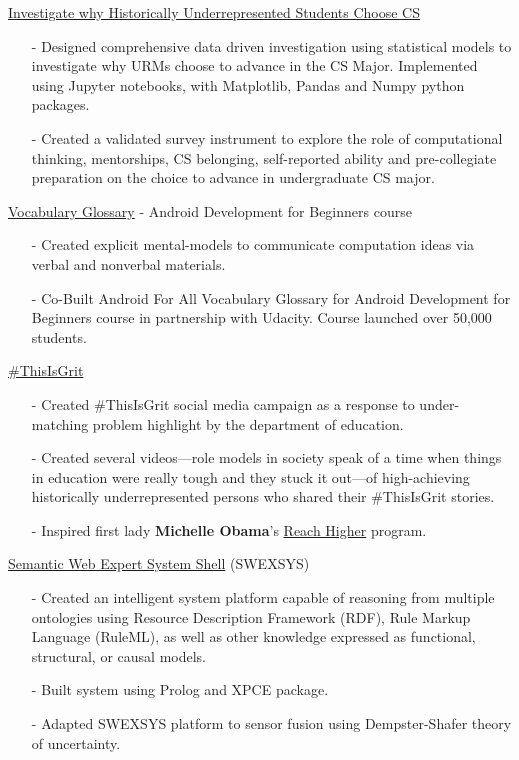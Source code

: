 \documentclass[11pt,article,oneside]{memoir}
\begin{document}
\ind \href{https://github.com/omoju/investigatingWhyURMsChooseCS}{Investigate why Historically Underrepresented Students Choose CS}
\begin{itemize}[noitemsep,nolistsep]
\item[-] Designed comprehensive data driven investigation using statistical models to investigate why URMs choose to advance in the CS Major. Implemented using Jupyter notebooks, with Matplotlib, Pandas and Numpy python packages.
\item[-] Created a validated survey instrument to explore the role of computational thinking, mentorships, CS belonging, self-reported ability and pre-collegiate preparation on the choice to advance in undergraduate CS major.  
\end{itemize} 

\ind \href{https://developers.google.com/android/for-all/vocab-words/}{Vocabulary Glossary} - Android Development for Beginners course
\begin{itemize}[noitemsep,nolistsep]
\item[-] Created explicit mental-models to communicate computation ideas via verbal and nonverbal materials.
\item[-] Co-Built Android For All Vocabulary Glossary for Android Development for Beginners course in partnership with Udacity. Course launched over 50,000 students.
\end{itemize} 

\ind \href{https://www.youtube.com/channel/UCZK66JujoN3KY3sak2kEa2w?&ab_channel=ThisIsGRIT}{\#ThisIsGrit}
\begin{itemize}[noitemsep,nolistsep]
\item[-] Created \#ThisIsGrit social media campaign as a response to under-matching problem highlight by the department of education.
\item[-] Created several videos---role models in society speak of a time when things in education were really tough and they stuck it out---of high-achieving historically underrepresented persons who shared their \#ThisIsGrit stories.
\item[-] Inspired first lady \textbf{Michelle Obama}'s \href{https://www.whitehouse.gov/reach-higher}{Reach Higher} program. 
\end{itemize} 

\ind \href{https://github.com/omoju/SWEXSYS}{Semantic Web Expert System Shell} (SWEXSYS)
\begin{itemize}[noitemsep,nolistsep]
\item[-] Created an intelligent system platform capable of reasoning from multiple ontologies using Resource Description Framework (RDF), Rule Markup Language (RuleML), as well as other knowledge expressed as functional, structural, or causal models.
\item[-] Built system using Prolog and XPCE package.
\item[-] Adapted SWEXSYS platform to sensor fusion using Dempster-Shafer theory of uncertainty.
\end{itemize} 
\end{document}
